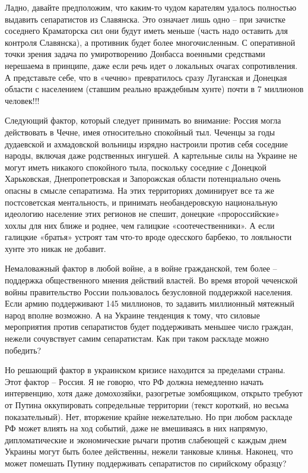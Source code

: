 Ладно, давайте предположим, что каким-то чудом карателям удалось полностью
выдавить сепаратистов из Славянска. Это означает лишь одно – при зачистке
соседнего Краматорска сил они будут иметь меньше (часть надо оставить для
контроля Славянска), а противник будет более многочисленным. С оперативной
точки зрения задача по умиротворению Донбасса военными средствами нерешаема в
принципе, даже если речь идет о локальных очагах сопротивления. А представьте
себе, что в «чечню» превратилось сразу Луганская и Донецкая области с
населением (ставшим реально враждебным хунте) почти в 7 миллионов человек!!!

Следующий фактор, который следует принимать во внимание: Россия могла
действовать в Чечне, имея относительно спокойный тыл. Чеченцы за годы
дудаевской и ахмадовской вольницы изрядно настроили против себя соседние
народы, включая даже родственных ингушей. А картельные силы на Украине не могут
иметь никакого спокойного тыла, поскольку соседние с Донецкой  Харьковская,
Днепропетровская и Запорожская области потенциально очень опасны в смысле
сепаратизма. На этих территориях доминирует все та же постсоветская
ментальность, и принимать необандеровскую национальную идеологию население этих
регионов не спешит, донецкие «пророссийские» хохлы для них ближе и роднее, чем
галицкие «соотечественники». А если галицкие «братья» устроят там что-то вроде
одесского барбекю, то лояльности хунте это никак не добавит.

Немаловажный фактор в любой войне, а в войне гражданской, тем более –
поддержка общественного мнения действий властей. Во время второй чеченской
войны правительство России пользовалось безусловной поддержкой населения. Если
армию поддерживают 145 миллионов, то задавить миллионный мятежный народ вполне
возможно. А на Украине тенденция к тому, что силовые мероприятия против
сепаратистов будет поддерживать меньшее число граждан, нежели сочувствует самим
сепаратистам. Как при таком раскладе можно победить?

Но решающий фактор в украинском кризисе находится за пределами страны. Этот
фактор – Россия. Я не говорю, что РФ должна немедленно начать интервенцию, хотя
даже домохозяйки, разогретые зомбоящиком, открыто требуют от Путина
оккупировать сопредельные территории (текст короткий, но весьма
показательный). Нет, вторжение крайне нежелательно. Но при любом раскладе РФ
может влиять на ход событий, даже не вмешиваясь в них напрямую, дипломатические
и экономические рычаги против слабеющей с каждым днем Украины могут быть более
действенны, нежели танковые клинья. Наконец, что может помешать Путину
поддерживать сепаратистов по сирийскому образцу?

